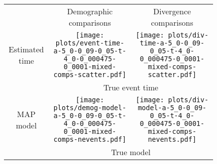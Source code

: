 \documentclass[border=10pt,varwidth=30cm]{standalone}
\begin{document}
\begin{figure}
    \centering
    \begin{tabular}{@{}ccc@{}}
        & \multirow{1}{0.15\textwidth}{\Large\centering Demographic comparisons}
        & \multirow{1}{0.15\textwidth}{\Large\centering Divergence comparisons} \\[5ex]
        \multirow{1}{*}[8em]{\begin{sideways}\large Estimated time\end{sideways}}
        & \texttt{[image: plots/event-time-a-5\_0-0\_09-0\_05-t-4\_0-0\_000475-0\_0001-mixed-comps-scatter.pdf]}
        & \texttt{[image: plots/div-time-a-5\_0-0\_09-0\_05-t-4\_0-0\_000475-0\_0001-mixed-comps-scatter.pdf]} \\
        & \multicolumn{2}{c}{\large True event time} \\
        \multirow{1}{*}[7.5em]{\begin{sideways}\large MAP model\end{sideways}}
        & \texttt{[image: plots/demog-model-a-5\_0-0\_09-0\_05-t-4\_0-0\_000475-0\_0001-mixed-comps-nevents.pdf]}
        & \texttt{[image: plots/div-model-a-5\_0-0\_09-0\_05-t-4\_0-0\_000475-0\_0001-mixed-comps-nevents.pdf]} \\
        & \multicolumn{2}{c}{\large True model} \\
    \end{tabular}
\end{figure}
\end{document}
